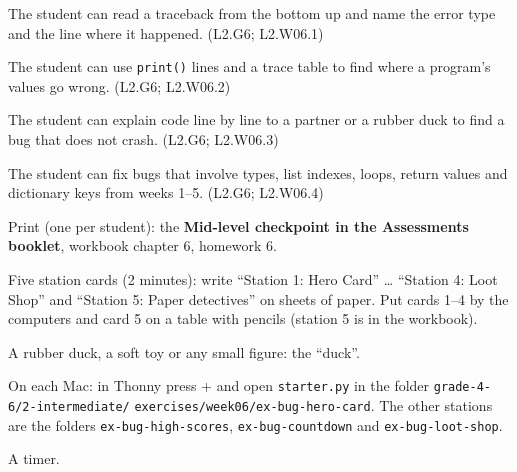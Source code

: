 
\begin{objectives}
  \item The student can read a traceback from the bottom up and name the error type and the line where it happened. (L2.G6; L2.W06.1)
  \item The student can use \texttt{print()} lines and a trace table to find where a program's values go wrong. (L2.G6; L2.W06.2)
  \item The student can explain code line by line to a partner or a rubber duck to find a bug that does not crash. (L2.G6; L2.W06.3)
  \item The student can fix bugs that involve types, list indexes, loops, return values and dictionary keys from weeks 1--5. (L2.G6; L2.W06.4)
\end{objectives}

\begin{materials}
  \item Print (one per student): the \textbf{Mid-level checkpoint in the Assessments booklet}, workbook chapter 6, homework 6.
  \item Five station cards (2 minutes): write \enquote{Station 1: Hero Card} \ldots{} \enquote{Station 4: Loot Shop} and \enquote{Station 5: Paper detectives}
        on sheets of paper. Put cards 1--4 by the computers and card 5 on a table with pencils (station 5 is in the workbook).
  \item A rubber duck, a soft toy or any small figure: the \enquote{duck}.
  \item On each Mac: in Thonny press + and open \texttt{starter.py} in the folder \texttt{grade-4-6/2-intermediate/} \texttt{exercises/week06/ex-bug-hero-card}.
        The other stations are the folders \texttt{ex-bug-high-scores}, \texttt{ex-bug-countdown} and \texttt{ex-bug-loot-shop}.
  \item A timer.
\end{materials}

